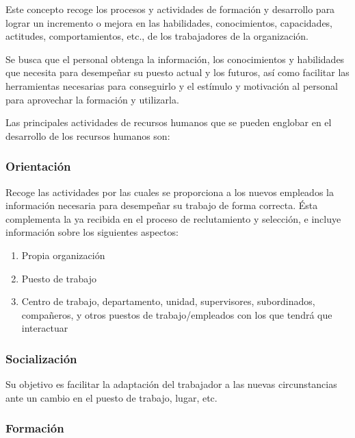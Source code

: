 \documentclass[10pt,a4paper,spanish]{report}
\begin{document}
                  Este concepto recoge los procesos y actividades de formación y desarrollo para lograr un incremento o mejora en las habilidades, conocimientos, capacidades, actitudes, comportamientos, etc., de los trabajadores de la organización.

                  Se busca que el personal obtenga la información, los conocimientos y habilidades que necesita para desempeñar su puesto actual y los futuros, así como facilitar las herramientas necesarias para conseguirlo y el estímulo y motivación al personal para aprovechar la formación y utilizarla.

                  Las principales actividades de recursos humanos que se pueden englobar en el desarrollo de los recursos humanos son:

                  \subsubsection{\textcolor[rgb]{0.8,0.2,0.8}Orientación}

                        Recoge las actividades por las cuales se proporciona a los nuevos empleados la información necesaria para desempeñar su trabajo de forma correcta. Ésta complementa la ya recibida en el proceso de reclutamiento y selección, e incluye información sobre los siguientes aspectos:
                        \begin{enumerate}
                              \item Propia organización
                              \item Puesto de trabajo
                              \item Centro de trabajo, departamento, unidad, supervisores, subordinados, compañeros, y otros puestos de trabajo/empleados con los que tendrá que interactuar
                        \end{enumerate}

                  \subsubsection{\textcolor[rgb]{0.8,0.2,0.8}Socialización}

                        Su objetivo es facilitar la adaptación del trabajador a las nuevas circunstancias ante un cambio en el puesto de trabajo, lugar, etc.

                  \subsubsection{\textcolor[rgb]{0.8,0.2,0.8}Formación}
\end{document}
